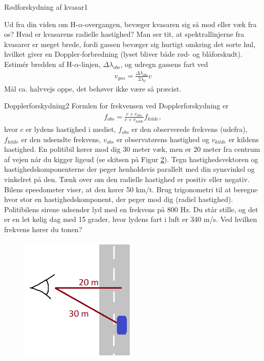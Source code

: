 \begin{opgave}{Rødforskydning af kvasar}{1}
\begin{figure}[h!]
		\caption{ } %
		\label{kvasar}
	\end{figure}
	\opg Ud fra din viden om H-$\alpha$-overgangen, bevæger kvasaren sig så mod eller væk fra os?
	\opg Hvad er kvasarens radielle hastighed?
	\opg Man ser tit, at spektrallinjerne fra kvasarer er meget brede, fordi gassen bevæger sig hurtigt omkring det sorte hul, hvilket giver en Doppler-forbredning
	(lyset bliver både rød- og blåforskudt). Estimér bredden af H-$\alpha$-linjen, $\Delta\lambda_{obs}$, og udregn gassens fart ved 
	\begin{align}
	v_{gas}=\frac{\Delta \lambda_{obs}}{2\lambda_{0}}c
	\end{align}
	Mål ca. halvvejs oppe, det behøver ikke være så præcist.
\end{opgave}
\begin{opgave}{Dopplerforskydning}{2}
	Formlen for frekvensen ved Dopplerforskydning er
	\begin{align}
		f_{obs} = \frac{c+v_{obs}}{c+v_{kilde}} f_{kilde},
	\end{align}
	hvor $c$ er lydens hastighed i mediet, $f_{obs}$ er den observerede frekvens (udefra), $f_{kilde}$ er den udsendte frekvens, $v_{obs}$ er observatørens hastighed og $v_{kilde}$ er kildens hastighed.
	\opg En politibil kører mod dig 30 meter væk, men er 20 meter fra centrum af vejen når du kigger ligeud (se skitsen på Figur \ref{politi}). Tegn hastighedsvektoren og hastighedskomponenterne der peger henholdsvis parallelt med din synsvinkel og vinkelret på den. Tænk over om den radielle hastighed er positiv eller negativ.
	\opg Bilens speedometer viser, at den kører 50 km/t. Brug trigonometri til at beregne hvor stor en hastighedskomponent, der peger mod dig (radiel hastighed). %
	\opg Politibilens sirene udsender lyd med en frekvens på 800 Hz. Du står stille, og det er en let kølig dag med 15 grader, hvor lydens fart i luft er 340 m/s. Ved hvilken frekvens hører du tonen?
	\begin{figure}[h!]
		\centering
		\includegraphics[width=0.5\textwidth]{Astrofysik/Astrofig/politi.png}
		\caption{ }
		\label{politi}
	\end{figure}
\end{opgave}
